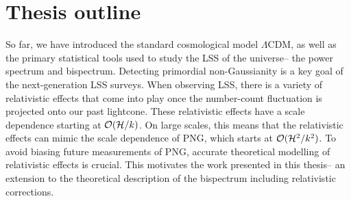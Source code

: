 \section{Thesis outline}

So far, we have introduced the standard cosmological model $\Lambda$CDM, as well as the primary statistical tools used to study the LSS of the universe-- the power spectrum and bispectrum. Detecting primordial non-Gaussianity is a key goal of the next-generation LSS surveys. When observing LSS, there is a variety of relativistic effects that come into play once the number-count fluctuation is projected onto our past lightcone. These relativistic effects have a scale dependence starting at $\mathcal{O}(\mathcal{H}/k)$. On large scales, this means that the relativistic effects can mimic the scale dependence of PNG, which starts at $\mathcal{O}(\mathcal{H}^2/k^2)$. To avoid biasing future measurements of PNG, accurate theoretical modelling of relativistic effects is crucial. This motivates the work presented in this thesis-- an extension to the theoretical description of the bispectrum including relativistic corrections.

